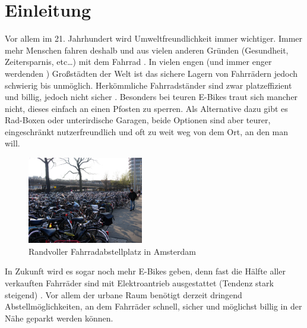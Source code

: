 \section{Einleitung}
Vor allem im 21. Jahrhundert wird Umweltfreundlichkeit immer wichtiger. Immer mehr Menschen fahren deshalb und aus vielen anderen Gründen (Gesundheit, Zeitersparnis, etc…) mit dem Fahrrad . In vielen engen (und immer enger werdenden ) Großstädten der Welt ist das sichere Lagern von Fahrrädern jedoch schwierig bis unmöglich. Herkömmliche Fahrradständer sind zwar platzeffizient und billig, jedoch nicht sicher . Besonders bei teuren E-Bikes traut sich mancher nicht, dieses einfach an einen Pfosten zu sperren. Als Alternative dazu gibt es Rad-Boxen oder unterirdische Garagen, beide Optionen sind aber teurer, eingeschränkt nutzerfreundlich und oft zu weit weg von dem Ort, an den man will.

\begin{figure}[H]
    \centering
    \includegraphics[width=0.45\textwidth]{images/fahrrad_parkhaus_voll}
    \caption{Randvoller Fahrradabstellplatz in Amsterdam }
    \label{fig:fahrrad_parkhaus_voll}
\end{figure}

In Zukunft wird es sogar noch mehr E-Bikes geben, denn fast die Hälfte aller verkauften Fahrräder sind mit Elektroantrieb ausgestattet (Tendenz stark steigend) . Vor allem der urbane Raum benötigt derzeit dringend Abstellmöglichkeiten, an dem Fahrräder schnell, sicher und möglichst billig in der Nähe geparkt werden können.

\clearpage


\clearpage



